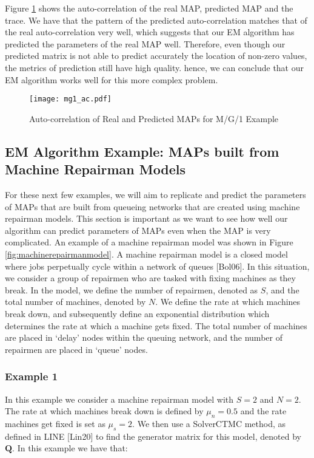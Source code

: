 \documentclass[a4paper,11pt,titlepage]{article}
\begin{document}
Figure \ref{fig:mg1_ac} shows the auto-correlation of the real MAP, predicted MAP and the trace. We have that the pattern of the predicted auto-correlation matches that of the real auto-correlation very well, which suggests that our EM algorithm has predicted the parameters of the real MAP well. Therefore, even though our predicted matrix is not able to predict accurately the location of non-zero values, the metrics of prediction still have high quality. hence, we can conclude that our EM algorithm works well for this more complex problem. 

\begin{figure}[h!]
\begin{center}
\texttt{[image: mg1\_ac.pdf]}
\caption{Auto-correlation of Real and Predicted MAPs for M/G/1 Example}
\label{fig:mg1_ac}
\end{center}
\end{figure}

\subsection{EM Algorithm Example: MAPs built from Machine Repairman Models}

For these next few examples, we will aim to replicate and predict the parameters of MAPs that are built from queueing networks that are created using machine repairman models. This section is important as we want to see how well our algorithm can predict parameters of MAPs even when the MAP is very complicated. An example of a machine repairman model was shown in Figure \ref{fig:machinerepairmanmodel}. A machine repairman model is a closed model where jobs perpetually cycle within a network of queues [Bol06]. In this situation, we consider a group of repairmen who are tasked with fixing machines as they break. In the model, we define the number of repairmen, denoted as $S$, and the total number of machines, denoted by $N$. We define the rate at which machines break down, and subsequently define an exponential distribution which determines the rate at which a machine gets fixed. The total number of machines are placed in `delay' nodes within the queuing network, and the number of repairmen are placed in `queue' nodes.

\subsubsection{Example 1}

In this example we consider a machine repairman model with $S = 2$ and $N=2$. The rate at which machines break down is defined by $\mu_n = 0.5$ and the rate machines get fixed is set as $\mu_s = 2$. We then use a SolverCTMC method, as defined in LINE [Lin20] to find the generator matrix for this model, denoted by $\mathbf{Q}$. In this example we have that:
\end{document}
